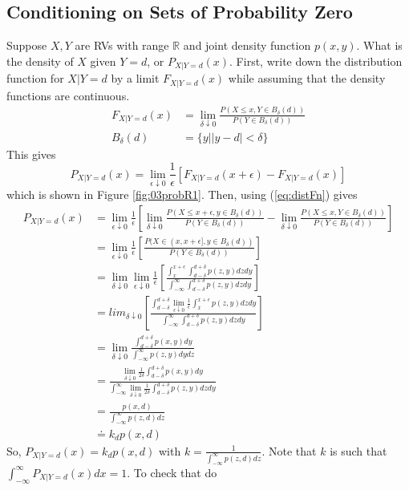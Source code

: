 \documentclass[lecture,12pt,]{pcms-l}
\theoremstyle{example}
\begin{document}
\subsection{Conditioning on Sets of Probability Zero}
Suppose $X,Y$ are RVs with range $\mathbb{R}$ and joint density function $p(x,y)$. What is the density of $X$ given $Y=d$, or $P_{X|Y=d}(x)$. First, write down the distribution function for $X|Y=d$ by a limit $F_{X|Y=d}(x)$ while assuming that the density functions are continuous.
\begin{align}
\label{eq:distFn}
F_{X|Y=d}(x) &= \lim_{\delta\downarrow 0}\frac{P(X\leq x, Y\in B_\delta(d))}{P(Y\in B_\delta(d))} \\
B_\delta(d) &= \{y | |y-d| < \delta\} \nonumber
\end{align}
This gives
$$P_{X|Y=d}(x) = \lim_{\epsilon\downarrow 0}\frac{1}{\epsilon}[F_{X|Y=d}(x+\epsilon) - F_{X|Y=d}(x)]$$
which is shown in Figure \ref{fig:03probR1}.
Then, using (\ref{eq:distFn}) gives
\begin{align*}
P_{X|Y=d}(x) &= \lim_{\epsilon\downarrow 0}\frac{1}{\epsilon}\left[\lim_{\delta\downarrow 0} \frac{P(X\leq x+\epsilon, y\in B_\delta(d))}{P(Y\in B_\delta(d))} - \lim_{\delta\downarrow 0} \frac{P(X\leq x, Y\in B_\delta(d))}{P(Y\in B_\delta(d))}\right] \\
&= \lim_{\epsilon\downarrow 0}\frac{1}{\epsilon}\left[ \frac{P(X\in(x,x+\epsilon],y\in B_\delta(d))}{P(Y\in B_\delta(d))}\right] \\
&= \lim_{\delta\downarrow 0}\lim_{\epsilon\downarrow 0}\frac{1}{\epsilon} \left[ \frac{\int_x^{x+\epsilon} \int_{d-\delta}^{d+\delta} p(z,y)dzdy}{\int_{-\infty}^\infty \int_{d-\delta}^{d+\delta} p(z,y)dzdy}\right] \\
&= lim_{\delta\downarrow 0}\left[ \frac{\int_{d-\delta}^{d+\delta}\lim_{\epsilon\downarrow 0} \frac{1}{\epsilon} \int_x^{x+\epsilon} p(z,y)dzdy}{\int_{-\infty}^\infty \int_{d-\delta}^{d+\delta} p(z,y)dzdy}\right] \\
&= \lim_{\delta\downarrow 0} \frac{\int_{d-\delta}^{d+\delta}p(x,y)dy}{\int_{-\infty}^\infty p(z,y)dydz} \\
&= \frac{\lim_{\delta\downarrow 0}\frac{1}{2\delta}\int_{d-\delta}^{d+\delta} p(x,y)dy}{\int_{-\infty}^\infty \lim_{\delta\downarrow 0}\frac{1}{2\delta}\int_{d-\delta}^{d+\delta} p(z,y)dzdy} \\
&= \frac{p(x,d)}{\int_{-\infty}^\infty p(z,d)dz} \\
&\doteq k_dp(x,d)
\end{align*}
So, $P_{X|Y=d}(x) = k_dp(x,d)$ with $k=\frac{1}{\int_{-\infty}^\infty p(z,d)dz}$. Note that $k$ is such that $\int_{-\infty}^\infty P_{X|Y=d}(x)dx=1$. To check that do
\end{document}
